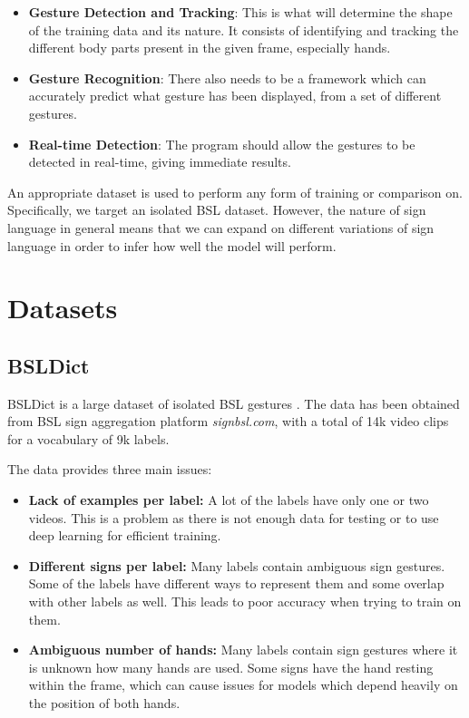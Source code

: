 \documentclass[final,rdr32.tex]{subfiles}
\begin{document}
\begin{itemize}
    \item \textbf{Gesture Detection and Tracking}: This is what will determine the shape of the training data and its nature. It consists of identifying and tracking the different body parts present in the given frame, especially hands.
    \item \textbf{Gesture Recognition}: There also needs to be a framework which can accurately predict what gesture has been displayed, from a set of different gestures.
    \item \textbf{Real-time Detection}: The program should allow the gestures to be detected in real-time, giving immediate results.

\end{itemize}

An appropriate dataset is used to perform any form of training or comparison on. Specifically, we target an isolated BSL dataset. However, the nature of sign language in general means that we can expand on different variations of sign language in order to infer how well the model will perform.


\section{Datasets}

\subsection*{BSLDict}

BSLDict is a large dataset of isolated BSL gestures \cite{momeni2020watch}. The data has been obtained from BSL sign aggregation platform \textit{signbsl.com}, with a total of 14k video clips for a vocabulary of 9k labels.

The data provides three main issues:

\begin{itemize}
    \item \textbf{Lack of examples per label: }A lot of the labels have only one or two videos. This is a problem as there is not enough data for testing or to use deep learning for efficient training.
    \item \textbf{Different signs per label: }Many labels contain ambiguous sign gestures. Some of the labels have different ways to represent them and some overlap with other labels as well. This leads to poor accuracy when trying to train on them.
    \item \textbf{Ambiguous number of hands: }Many labels contain sign gestures where it is unknown how many hands are used. Some signs have the hand resting within the frame, which can cause issues for models which depend heavily on the position of both hands.
\end{itemize}
\end{document}
